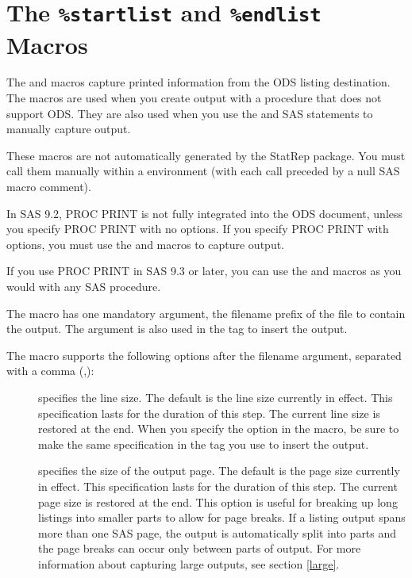 \documentclass[article,oneside]{memoir}
\newcommand*{\StatRep}{\textsf{StatRep}\xspace}
\begin{document}
 \section{The \texttt{\%startlist} and \texttt{\%endlist} Macros}\label{startlist}

  The  and  macros capture printed information
  from the ODS listing destination. The macros are used when
  you create output with a procedure that does not support ODS.
  They are also used when you use the
   and  SAS statements to
  manually capture output.

  These macros are not automatically generated by the \StatRep package.
  You must call them
  manually within a  environment (with each call preceded
  by a null SAS macro comment).

  In SAS 9.2, PROC PRINT is not fully integrated into the ODS document,
  unless you specify PROC PRINT with no options.
  If you specify PROC PRINT
  with options, you must use the  and 
  macros to capture output.

  If you use PROC PRINT in SAS 9.3 or later,
  you can use the  and  macros as you would with
  any SAS procedure.

  The  macro has one mandatory argument, the filename prefix
  of the file to contain
  the output. The argument is also used
  in the  tag to insert the output.

  The  macro supports the following options after
  the filename argument, separated with a comma (,):
  \begin{description}
  \item[] specifies the line size.
  The default is the line size currently in effect.
  This specification lasts for the duration of this step.
  The current line size is restored at the end.
  When you specify the  option in the 
  macro, be sure to make the same specification
  in the  tag you use to insert the output.

  \item[] specifies the size of the output page.
   The default is the page size currently in effect.
   This specification lasts for the duration of this step.
  The current page size is restored at the end.
  This option is useful for breaking up long listings into smaller parts to allow for page breaks.
  If a listing output spans more than one SAS page,
  the output is automatically split into parts and the page breaks
  can occur only between parts of output.
  For more information about capturing large outputs, see section \ref{large}.
  \end{description}
\end{document}
